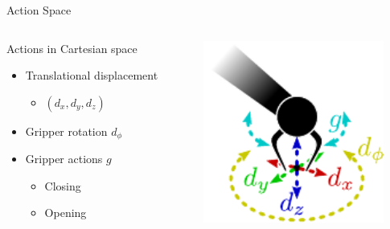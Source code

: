 \begin{frame}{Action Space}{}
    \begin{columns}%
        \begin{column}{0.4\textwidth}%
            \begin{block}{Actions in Cartesian space}
                \begin{itemize}
                    \item Translational displacement
                    \begin{itemize}
                        \item \((d_{x},d_{y},d_{z})\)
                    \end{itemize}
                    \item Gripper rotation \(d_{\phi}\)
                    \item Gripper actions \(g\)
                    \begin{itemize}
                        \item Closing
                        \item Opening
                    \end{itemize}
                \end{itemize}
            \end{block}
        \end{column}
        \begin{column}{0.6\textwidth}%
            \centering
            \includegraphics[height=6cm]{graphics/action_space.pdf}
        \end{column}
    \end{columns}
\end{frame}
